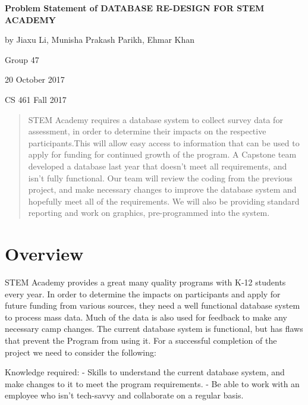 \documentclass[onecolumn, draftclsnofoot,10pt, compsoc]{IEEEtran}
\begin{document}
\begin{titlepage}
		
		\begin{center}
		\bigbreak	
		\textbf{Problem Statement of DATABASE RE-DESIGN FOR STEM ACADEMY}
	
  	by Jiaxu Li, Munisha Prakash Parikh, Ehmar Khan

  	  Group 47

  	  20 October 2017
   
		 CS 461 Fall 2017
    
   		\end{center}
        \begin{abstract}
        STEM Academy requires a database system to collect survey data for assessment, in order to determine their impacts on the respective participants.This will allow easy access to information that can be used to apply for funding for continued growth of the program. A Capstone team developed a database last year that doesn't meet all requirements, and isn't fully functional. Our team will review the coding from the previous project, and make necessary changes to improve the database system and hopefully meet all of the requirements. We will also be providing standard reporting and work on graphics, pre-programmed into the system.
        \end{abstract}     
\end{titlepage}
\newpage
{}
\clearpage

\section{Overview}
STEM Academy provides a great many quality programs with K-12 students every year. In order to determine the impacts on participants and apply for future funding from various sources, they need a well functional database system to process mass data. Much of the data is also used for feedback to make any necessary camp changes. The current database system is functional, but has flaws that prevent the Program from using it. For a successful completion of the project we need to consider the following:
\newline \newline

Knowledge required: \newline
- Skills to understand the current database system, and make changes to it to meet the program requirements. \newline
- Be able to work with an employee who isn\rq t tech-savvy and collaborate on a regular basis.\newline\newline
\end{document}
